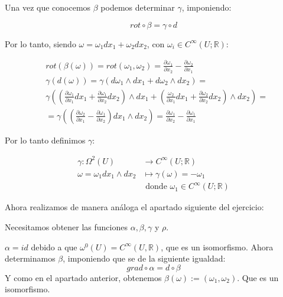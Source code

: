 Una vez que conocemos $\beta $ podemos determinar $\gamma $, imponiendo:

$$rot \circ \beta = \gamma \circ d $$

Por lo tanto, siendo $\omega=\omega_1dx_1+\omega_2dx_2$, con $\omega_i\in C^\infty(U;\mathbb{R})$:

\begin{equation}
  \begin{split}
    &rot(\beta (\omega)) = rot(\omega_1,\omega_2)=\frac{\partial \omega_1}{\partial x_2}-\frac{\partial \omega_2}{\partial x_1} \\
    &\gamma(d(\omega))=\gamma (d\omega_1\wedge dx_1+d\omega_2\wedge dx_2)=\\
    &\gamma ((\frac{\partial \omega_1}{\partial x_1}dx_1+\frac{\partial \omega_1}{\partial x_2}dx_2)\wedge dx_1 +(\frac{\omega_2}{\partial x_1}dx_1+\frac{\partial \omega_2}{\partial x_2}dx_2)\wedge dx_2)= \\
    &= \gamma((\frac{\partial \omega_2}{\partial x_1}-\frac{\partial \omega_1}{\partial x_2})dx_1\wedge dx_2) = \frac{\partial \omega_1}{\partial x_2}-\frac{\partial \omega_1}{\partial x_1}
  \end{split}
\end{equation}

Por lo tanto definimos $\gamma $:

\begin{equation}
  \begin{split}
    \gamma: \Omega^2(U) &\rightarrow C^\infty(U;\mathbb{R}) \\
    \omega= \omega_1 dx_1\wedge dx_2 &\mapsto \gamma(\omega) = -\omega_1 \\
    &\text{ donde } \omega_1\in C^\infty (U;\mathbb{R})
  \end{split}
\end{equation}

Ahora realizamos de manera análoga el apartado siguiente del ejercicio:

\vspace{30mm}


Necesitamos obtener las funciones $\alpha,\beta,\gamma $ y $\rho $.

$\alpha = id$ debido a que $\omega^0(U)=C^\infty (U,\mathbb{R})$, que es un isomorfismo. Ahora determinamos $\beta $, imponiendo que se de la siguiente igualdad:
$$grad \circ \alpha = d \circ \beta $$
Y como en el apartado anterior, obtenemos $\beta(\omega) := (\omega_1,\omega_2) $. Que es un isomorfismo. 


